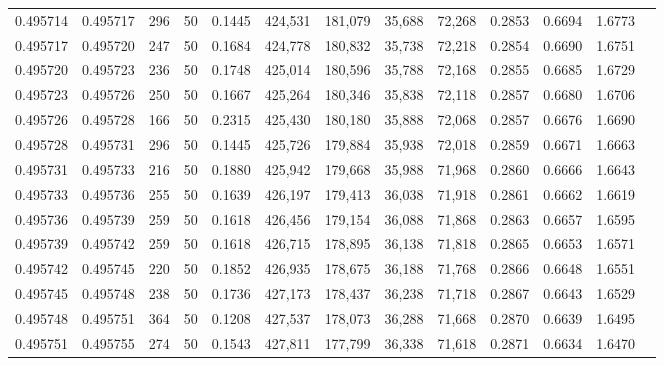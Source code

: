 \begin{tabular}{rrrrrrrrrrrrr}
0.495714 & 0.495717 &   296 &  50 &                                     0.1445 & 424,531 & 181,079 &  35,688 &  72,268 & 0.2853 & 0.6694 & 1.6773 \\
0.495717 & 0.495720 &   247 &  50 &                                     0.1684 & 424,778 & 180,832 &  35,738 &  72,218 & 0.2854 & 0.6690 & 1.6751 \\
0.495720 & 0.495723 &   236 &  50 &                                     0.1748 & 425,014 & 180,596 &  35,788 &  72,168 & 0.2855 & 0.6685 & 1.6729 \\
0.495723 & 0.495726 &   250 &  50 &                                     0.1667 & 425,264 & 180,346 &  35,838 &  72,118 & 0.2857 & 0.6680 & 1.6706 \\
0.495726 & 0.495728 &   166 &  50 &                                     0.2315 & 425,430 & 180,180 &  35,888 &  72,068 & 0.2857 & 0.6676 & 1.6690 \\
0.495728 & 0.495731 &   296 &  50 &                                     0.1445 & 425,726 & 179,884 &  35,938 &  72,018 & 0.2859 & 0.6671 & 1.6663 \\
0.495731 & 0.495733 &   216 &  50 &                                     0.1880 & 425,942 & 179,668 &  35,988 &  71,968 & 0.2860 & 0.6666 & 1.6643 \\
0.495733 & 0.495736 &   255 &  50 &                                     0.1639 & 426,197 & 179,413 &  36,038 &  71,918 & 0.2861 & 0.6662 & 1.6619 \\
0.495736 & 0.495739 &   259 &  50 &                                     0.1618 & 426,456 & 179,154 &  36,088 &  71,868 & 0.2863 & 0.6657 & 1.6595 \\
0.495739 & 0.495742 &   259 &  50 &                                     0.1618 & 426,715 & 178,895 &  36,138 &  71,818 & 0.2865 & 0.6653 & 1.6571 \\
0.495742 & 0.495745 &   220 &  50 &                                     0.1852 & 426,935 & 178,675 &  36,188 &  71,768 & 0.2866 & 0.6648 & 1.6551 \\
0.495745 & 0.495748 &   238 &  50 &                                     0.1736 & 427,173 & 178,437 &  36,238 &  71,718 & 0.2867 & 0.6643 & 1.6529 \\
0.495748 & 0.495751 &   364 &  50 &                                     0.1208 & 427,537 & 178,073 &  36,288 &  71,668 & 0.2870 & 0.6639 & 1.6495 \\
0.495751 & 0.495755 &   274 &  50 &                                     0.1543 & 427,811 & 177,799 &  36,338 &  71,618 & 0.2871 & 0.6634 & 1.6470 \\

\end{tabular}
